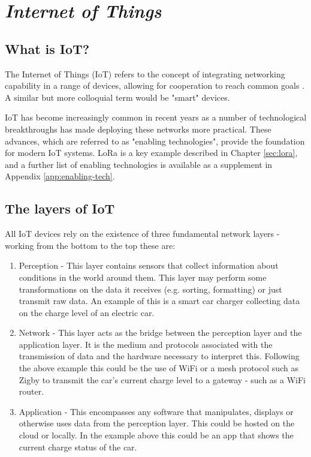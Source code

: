 \section{\emph{Internet of Things}}

\subsection{What is IoT?}

The Internet of Things (IoT) refers to the concept of integrating networking
capability in a range of devices, allowing for cooperation to reach common goals
\cite{atzori2010}. A similar but more colloquial term would be "smart" devices.

IoT has become increasingly common in recent years as a number of technological
breakthroughs has made deploying these networks more practical. These advances,
which are referred to as "enabling technologies", provide the foundation for
modern IoT systems. LoRa is a key example described in Chapter \ref{sec:lora},
and a further list of enabling technologies is available as a supplement in
Appendix \ref{app:enabling-tech}.

\subsection{The layers of IoT}

All IoT devices rely on the existence of three fundamental network layers
\cite{burhan2018iot} - working from the bottom to the top these are:

\begin{enumerate}
  \item Perception - This layer contains sensors that collect information about
        conditions in the world around them. This layer may perform some
        transformations on the data it receives (e.g. sorting, formatting) or
        just transmit raw data. An example of this is a smart car charger
        collecting data on the charge level of an electric car.
  \item Network - This layer acts as the bridge between the perception layer and
        the application layer. It is the medium and protocols associated with
        the transmission of data and the hardware necessary to interpret this.
        Following the above example this could be the use of WiFi or a mesh
        protocol such as Zigby to transmit the car's current charge level to a
        gateway - such as a WiFi router.
  \item Application - This encompasses any software that manipulates, displays
        or otherwise uses data from the perception layer. This could be hosted
        on the cloud or locally. In the example above this could be an app that
        shows the current charge status of the car.
\end{enumerate}

